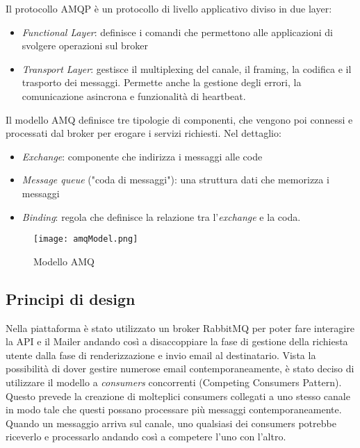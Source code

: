 Il protocollo AMQP è un protocollo di livello applicativo diviso in due layer:
\begin{itemize}
    \item \textit{Functional Layer}: definisce i comandi che permettono alle applicazioni di svolgere operazioni sul broker
    \item \textit{Transport Layer}:  gestisce il multiplexing del canale, il framing, la codifica e il trasporto dei messaggi. Permette anche la gestione degli errori, la comunicazione asincrona e funzionalità di heartbeat.
\end{itemize}

Il modello AMQ definisce tre tipologie di componenti, che vengono poi connessi e processati dal broker per erogare i servizi richiesti.
Nel dettaglio:
\begin{itemize}
    \item \textit{Exchange}: componente che indirizza i messaggi alle code
    \item \textit{Message queue} ("coda di messaggi"): una struttura dati che memorizza i messaggi
    \item \textit{Binding}: regola che definisce la relazione tra l'\textit{exchange} e la coda.
\end{itemize}

\begin{figure}[h]
    \centering
    \texttt{[image: amqModel.png]}
    \caption{Modello AMQ}
    \label{fig:AmqModel}
\end{figure}


\subsection{Principi di design}
Nella piattaforma è stato utilizzato un broker RabbitMQ per poter fare interagire la API e il Mailer
andando così a disaccoppiare la fase di gestione della richiesta utente dalla fase di renderizzazione e invio email al destinatario.
Vista la possibilità di dover gestire numerose email contemporaneamente, è stato deciso di utilizzare il modello a \textit{consumers} concorrenti (Competing Consumers Pattern)\cite{CompetingConsumers}.
Questo prevede la creazione di molteplici consumers collegati a uno stesso canale in modo tale che questi possano processare più messaggi contemporaneamente.
Quando un messaggio arriva sul canale, uno qualsiasi dei consumers potrebbe riceverlo e processarlo andando così a competere l'uno con l'altro.

